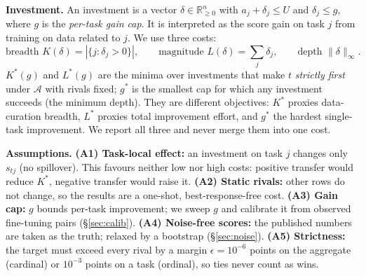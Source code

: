 \documentclass{article}
\theoremstyle{remark}
\newcommand{\R}{\mathbb{R}}
\begin{document}
\textbf{Investment.} An investment is a vector $\delta\in\R^n_{\ge0}$ with $a_j+\delta_j\le U$ and $\delta_j\le g$, where $g$ is the \emph{per-task gain cap}. It is interpreted as the score gain on task $j$ from training on data related to $j$. We use three costs:
\[
\text{breadth } K(\delta)=|\{j:\delta_j>0\}|,\qquad \text{magnitude } L(\delta)=\textstyle\sum_j\delta_j,\qquad \text{depth } \|\delta\|_\infty .
\]
$K^\ast(g)$ and $L^\ast(g)$ are the minima over investments that make $t$ \emph{strictly first} under $\mathcal A$ with rivals fixed; $g^\ast$ is the smallest cap for which any investment succeeds (the minimum depth). They are different objectives: $K^\ast$ proxies data-curation breadth, $L^\ast$ proxies total improvement effort, and $g^\ast$ the hardest single-task improvement. We report all three and never merge them into one cost.

\textbf{Assumptions.}
\textbf{(A1) Task-local effect:} an investment on task $j$ changes only $s_{tj}$ (no spillover). This favours neither low nor high costs: positive transfer would reduce $K^\ast$, negative transfer would raise it. \textbf{(A2) Static rivals:} other rows do not change, so the results are a one-shot, best-response-free cost. \textbf{(A3) Gain cap:} $g$ bounds per-task improvement; we sweep $g$ and calibrate it from observed fine-tuning pairs (\S\ref{sec:calib}). \textbf{(A4) Noise-free scores:} the published numbers are taken as the truth; relaxed by a bootstrap (\S\ref{sec:noise}). \textbf{(A5) Strictness:} the target must exceed every rival by a margin $\epsilon=10^{-6}$ points on the aggregate (cardinal) or $10^{-3}$ points on a task (ordinal), so ties never count as wins.
\end{document}

